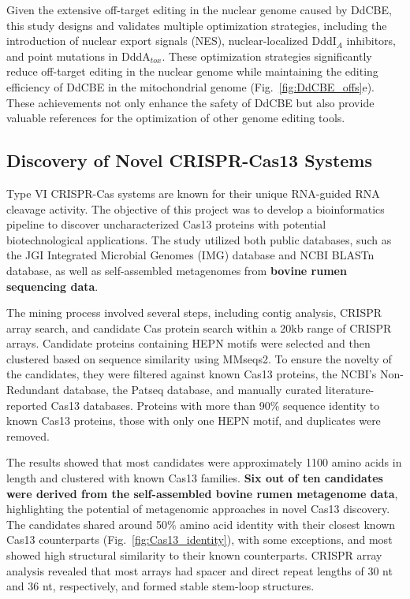 \documentclass[12pt]{article}
\begin{document}
Given the extensive off-target editing in the nuclear genome caused by DdCBE, 
this study designs and validates multiple optimization strategies, 
including the introduction of nuclear export signals (NES), nuclear-localized DddI$_A$ inhibitors, 
and point mutations in DddA$_{tox}$. 
These optimization strategies significantly reduce off-target editing in the 
nuclear genome while maintaining the editing efficiency of DdCBE in the mitochondrial genome (Fig.~\ref{fig:DdCBE_offs}e). 
These achievements not only enhance the safety of DdCBE but also provide valuable references 
for the optimization of other genome editing tools.

  

\subsection*{Discovery of Novel CRISPR-Cas13 Systems}

Type VI CRISPR-Cas systems are known for their unique RNA-guided RNA cleavage activity. 
The objective of this project was to develop a bioinformatics pipeline to discover 
uncharacterized Cas13 proteins with potential biotechnological applications. 
The study utilized both public databases, such as the JGI Integrated Microbial Genomes (IMG) database and NCBI BLASTn database, 
as well as self-assembled metagenomes from \textbf{bovine rumen sequencing data}.

The mining process involved several steps, including contig analysis, CRISPR array search, 
and candidate Cas protein search within a 20kb range of CRISPR arrays. 
Candidate proteins containing HEPN motifs were selected and then clustered based on sequence similarity using MMseqs2. 
To ensure the novelty of the candidates, they were filtered against known Cas13 proteins, 
the NCBI's Non-Redundant database, the Patseq database, and manually curated literature-reported Cas13 databases. 
Proteins with more than 90\% sequence identity to known Cas13 proteins, 
those with only one HEPN motif, and duplicates were removed.

The results showed that most candidates were approximately 1100 amino acids in length and clustered 
with known Cas13 families. 
\textbf{Six out of ten candidates were derived from the self-assembled bovine rumen metagenome data}, 
highlighting the potential of metagenomic approaches in novel Cas13 discovery. 
The candidates shared around 50\% amino acid identity with their closest known Cas13 counterparts (Fig.~\ref{fig:Cas13_identity}), 
with some exceptions, and most showed high structural similarity to their known counterparts. 
CRISPR array analysis revealed that most arrays had spacer and direct repeat lengths of 30 nt and 36 nt, 
respectively, and formed stable stem-loop structures.
\end{document}
